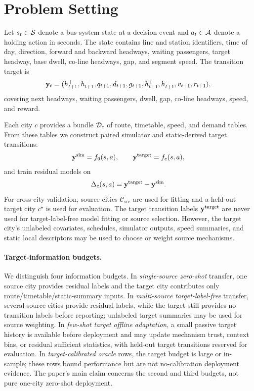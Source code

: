 \section{Problem Setting}

Let $s_t \in \mathcal{S}$ denote a bus-system state at a decision event and $a_t \in \mathcal{A}$ denote a holding action in seconds.
The state contains line and station identifiers, time of day, direction, forward and backward headways, waiting passengers, target headway, base dwell, co-line headways, gap, and segment speed.
The transition target is
\[
    \mathbf{y}_t =
    (h^+_{t+1}, h^-_{t+1}, q_{t+1}, d_{t+1}, g_{t+1},
     \bar h^+_{t+1}, \bar h^-_{t+1}, v_{t+1}, r_{t+1}),
\]
covering next headways, waiting passengers, dwell, gap, co-line headways, speed, and reward.

Each city $c$ provides a bundle $\mathcal{D}_c$ of route, timetable, speed, and demand tables.
From these tables we construct paired simulator and static-derived target transitions:
\[
    \mathbf{y}^{\mathrm{sim}} = f_0(s,a), \qquad
    \mathbf{y}^{\mathrm{target}} = f_c(s,a),
\]
and train residual models on
\[
    \Delta_c(s,a) = \mathbf{y}^{\mathrm{target}} - \mathbf{y}^{\mathrm{sim}}.
\]
For cross-city validation, source cities $\mathcal{C}_{\mathrm{src}}$ are used for fitting and a held-out target city $c^\star$ is used for evaluation.
The target transition labels $\mathbf{y}^{\mathrm{target}}$ are never used for target-label-free model fitting or source selection.
However, the target city's unlabeled covariates, schedules, simulator outputs, speed summaries, and static local descriptors may be used to choose or weight source mechanisms.

\paragraph{Target-information budgets.}
We distinguish four information budgets.
In \emph{single-source zero-shot} transfer, one source city provides residual labels and the target city contributes only route/timetable/static-summary inputs.
In \emph{multi-source target-label-free} transfer, several source cities provide residual labels, while the target still provides no transition labels before reporting; unlabeled target summaries may be used for source weighting.
In \emph{few-shot target offline adaptation}, a small passive target history is available before deployment and may update mechanism trust, context bias, or residual sufficient statistics, with held-out target transitions reserved for evaluation.
In \emph{target-calibrated oracle} rows, the target budget is large or in-sample; these rows bound performance but are not no-calibration deployment evidence.
The paper's main claim concerns the second and third budgets, not pure one-city zero-shot deployment.

